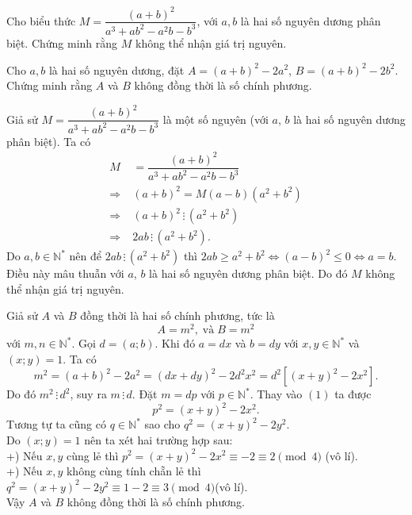 \begin{ex}%
	\text{}
    \begin{listEX}
        \item Cho biểu thức $M=\dfrac{(a+b)^2}{a^3+ab^2-a^2b-b^3}$, 
			với $a,b$ là hai số nguyên dương phân biệt. Chứng minh rằng $M$ không thể nhận giá trị nguyên.
        \item Cho $a,b$ là hai số nguyên dương, đặt $A=(a+b)^2-2a^2$, $B=(a+b)^2-2b^2.$ Chứng minh rằng $A$ và $B$ không đồng thời là số chính phương.
    \end{listEX}
\loigiai
    {
    \begin{listEX}
        \item Giả sử $M=\dfrac{(a+b)^2}{a^3+ab^2-a^2b-b^3}$ là một số nguyên (với $a$, $b$ là hai số nguyên dương phân biệt). Ta có \begin{align*}
M&=\dfrac{(a+b)^2}{a^3+ab^2-a^2b-b^3}\\ 
\Rightarrow\;&(a+b)^2=M(a-b)(a^2+b^2)\\
\Rightarrow\;&(a+b)^2\,\vdots\, (a^2+b^2)\\
\Rightarrow\;&2ab\,\vdots\, (a^2+b^2).
\end{align*}
Do $a,b\in\mathbb{N}^\ast$ nên để $2ab\,\vdots\, (a^2+b^2)$ thì $2ab\ge a^2+b^2\Leftrightarrow (a-b)^2\le 0\Leftrightarrow a=b$. Điều này mâu thuẫn với $a$, $b$ là hai số nguyên dương phân biệt. Do đó $M$ không thể nhận giá trị nguyên.
        \item Giả sử $A$ và $B$ đồng thời là hai số chính phương, tức là $$A=m^2,\;\text{và}\;B=m^2$$
với $m,n\in \mathbb{N}^\ast$. Gọi $d=(a;b)$. Khi đó $a=dx$ và $b=dy$ với $x,y\in \mathbb{N}^\ast$ và $(x;y)=1$. Ta có
\[m^2=(a+b)^2-2a^2=(dx+dy)^2-2d^2x^2=d^2\left[(x+y)^2-2x^2\right].\tag{1}\]
Do đó $m^2\,\vdots\, d^2$, suy ra $m\,\vdots\, d$. Đặt $m=dp$ với $p\in\mathbb{N}^\ast $. Thay vào $(1)$ ta được $$p^2=(x+y)^2-2x^2.$$
Tương tự ta cũng có $q\in\mathbb{N}^\ast $ sao cho $q^2=(x+y)^2-2y^2.$\\
Do $(x;y)=1$ nên ta xét hai trường hợp sau:\\
+) Nếu $x,y$ cùng lẻ thì $p^2=(x+y)^2-2x^2\equiv -2\equiv 2\pmod 4$ (vô lí). \\
+) Nếu $x,y$  không cùng tính chẵn lẻ thì $q^2=(x+y)^2-2y^2\equiv 1-2\equiv 3\pmod 4$(vô lí). \\
Vậy $A$ và $B$ không đồng thời là số chính phương.
    \end{listEX}
    }
\end{ex}

